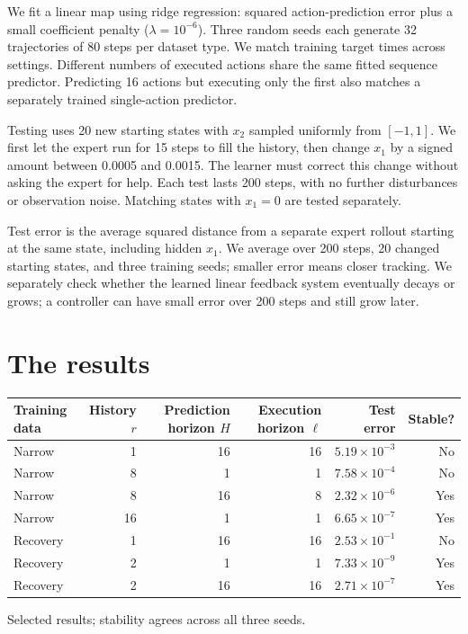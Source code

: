 \documentclass{l4dc2026}
\begin{document}
We fit a linear map using ridge regression: squared action-prediction error plus a small coefficient penalty ($\lambda=10^{-6}$). Three random seeds each generate 32 trajectories of 80 steps per dataset type. We match training target times across settings. Different numbers of executed actions share the same fitted sequence predictor. Predicting 16 actions but executing only the first also matches a separately trained single-action predictor.

Testing uses 20 new starting states with $x_2$ sampled uniformly from $[-1,1]$. We first let the expert run for 15 steps to fill the history, then change $x_1$ by a signed amount between 0.0005 and 0.0015. The learner must correct this change without asking the expert for help. Each test lasts 200 steps, with no further disturbances or observation noise. Matching states with $x_1=0$ are tested separately.

Test error is the average squared distance from a separate expert rollout starting at the same state, including hidden $x_1$. We average over 200 steps, 20 changed starting states, and three training seeds; smaller error means closer tracking. We separately check whether the learned linear feedback system eventually decays or grows; a controller can have small error over 200 steps and still grow later.

\section{The results}
\begin{center}\small
\begin{tabular}{lrrrrr}\toprule
Training data & History $r$ & Prediction horizon $H$ & Execution horizon $\ell$ & Test error & Stable?\\\midrule
Narrow & 1 & 16 & 16 & $5.19\times10^{-3}$ & No\\
Narrow & 8 & 1 & 1 & $7.58\times10^{-4}$ & No\\
Narrow & 8 & 16 & 8 & $2.32\times10^{-6}$ & Yes\\
Narrow & 16 & 1 & 1 & $6.65\times10^{-7}$ & Yes\\
Recovery & 1 & 16 & 16 & $2.53\times10^{-1}$ & No\\
Recovery & 2 & 1 & 1 & $7.33\times10^{-9}$ & Yes\\
Recovery & 2 & 16 & 16 & $2.71\times10^{-7}$ & Yes\\\bottomrule
\end{tabular}
\end{center}
\noindent Selected results; stability agrees across all three seeds.
\end{document}
